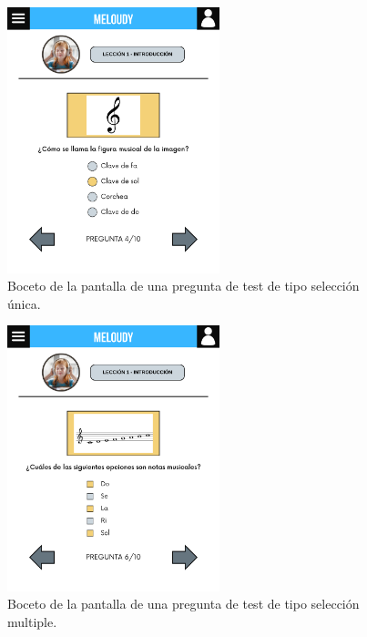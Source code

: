 \begin{figure}[H]
    \centering
    \centerline{\includegraphics[width=0.55\textwidth, frame]{imagenes/c6/5.png}}
    \caption{Boceto de la pantalla de una pregunta de test de tipo selección única.}
    \label{fig:seleccionunica}
\end{figure}


\begin{figure}[H]
    \centering
    \centerline{\includegraphics[width=0.55\textwidth, frame]{imagenes/c6/6.png}}
    \caption{Boceto de la pantalla de una pregunta de test de tipo selección multiple.}
    \label{fig:seleccionmultiple}
\end{figure}


